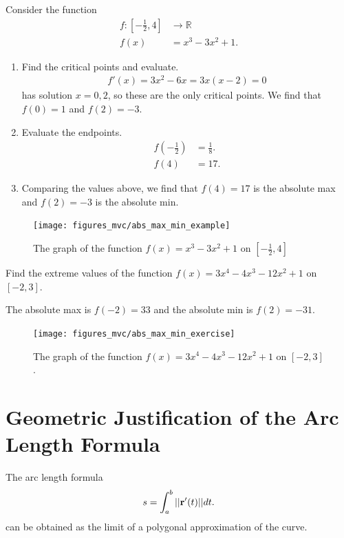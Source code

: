 \documentclass[12pt,letterpaper,reqno]{article}
\numberwithin{equation}{section}
\newcommand{\R}{\ensuremath{\mathbb R}}
\newcommand{\bbr}{{\bf r}}
\begin{document}
{\begin{example}
Consider the function
\begin{align*}
	f:\left[-\frac{1}{2},4\right] &\to \R \\
	f(x)&=x^3-3x^2+1.
\end{align*}	
\begin{enumerate}
	\item Find the critical points and evaluate.
	\begin{align*}
		f'(x)=3x^2-6x=3x(x-2)=0
	\end{align*}
	has solution $x=0,2$, so these are the only critical points. We find that $f(0)=1$ and $f(2)=-3$.
	\item Evaluate the endpoints.
	\begin{align*}
		f(-\frac{1}{2})&=\frac{1}{8}. \\
		f(4)&=17.
	\end{align*}
	\item Comparing the values above, we find that $f(4)=17$ is the absolute max and $f(2)=-3$ is the absolute min.
\end{enumerate}
\end{example}

\begin{figure}[h]
	\centering
	\texttt{[image: figures\_mvc/abs\_max\_min\_example]}
	\caption{The graph of the function $f(x)=x^3-3x^2+1$ on $[-\frac{1}{2},4]$}
\end{figure}

\begin{exercise}
Find the extreme values of the function $f(x)=3x^4-4x^3-12x^2+1$ on $[-2,3]$.	
\end{exercise}
\newpage 
{\color{red}
\begin{solution}
The absolute max is $f(-2)=33$ and the absolute min is $f(2)=-31$.	
\end{solution}
}
\begin{figure}[h]
	\centering
	\texttt{[image: figures\_mvc/abs\_max\_min\_exercise]}
	\caption{The graph of the function $f(x)=3x^4-4x^3-12x^2+1$ on $[-2,3]$.}
\end{figure}

\appendix
\section{Geometric Justification of the Arc Length Formula}\label{app:arc_length}
\begin{prop}
The arc length formula 
\begin{align}
	s=\int_a^b||\bbr'(t)||dt.
\end{align}
can be obtained as the limit of a polygonal approximation of the curve.
\end{prop}

}
\end{document}
